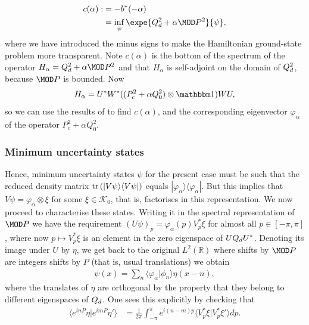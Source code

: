 \begin{align*}
  c(\alpha) :&= -b^*(-\alpha)\\
             &= \inf_\psi \expe{\Qd^2 + \alpha \MOD P^2}{\psi},
\end{align*}
where we have introduced the minus signs to make the Hamiltonian ground-state problem more transparent. Note $c(\alpha)$ is the bottom of the spectrum of the operator $H_\alpha=\Qd^2+\alpha \MOD P^2$ and that $H_\alpha$ is self-adjoint on the domain of $Q_d^2$, because $\MOD P$ is bounded. Now
$$
H_\alpha = U^*W^*((P_c^2+\alpha Q_0^2)\otimes \id)WU,
$$
so we can use the results of \cite{} to find $c(\alpha)$, and the corresponding eigenvector $\varphi_\alpha$ of the operator $P_c^2+\alpha Q_0^2$.

\subsubsection{Minimum uncertainty states}

Hence, minimum uncertainty states $\psi$ for the present case must be such that the reduced density matrix $\operatorname{tr}\left( |V\psi\rangle\langle V\psi| \right)$ equals $|\varphi_\alpha\rangle\langle \varphi_\alpha|$. But this implies that $V\psi =\varphi_\alpha\otimes \xi$ for some $\xi\in \mathcal K_0$, that is, factorises in this representation. We now proceed to characterise these states. Writing it in the spectral representation of $\MOD P$ we have the requirement
$(U\psi)_p = \varphi_\alpha(p) V^*_p\xi$
for almost all $p\in [-\pi,\pi]$, where now $p\mapsto V^*_p\xi$ is an element in the zero eigenspace of $UQ_d U^*$. Denoting its image under $U$ by $\eta$, we get back to the original $L^2(\mathbb R)$ where shifts by $\MOD P$ are integers shifts by $P$ (that is, usual translations) we obtain
\begin{align}\label{minURC}
\psi(x) = \sum_n \langle \varphi_\alpha|\phi_n\rangle \eta(x-n),
\end{align}
where the translates of $\eta$ are orthogonal by the property that they belong to different eigenspaces of $Q_d$. One sees this explicitly by checking that
\begin{align}\label{orth}
\langle e^{inP}\eta |e^{imP}\eta'\rangle & = \frac{1}{2\pi} \int_{-\pi}^{\pi} e^{i(n-m)p}\langle V^*_p\xi|V^*_{p}\xi'\rangle dp.
\end{align}

